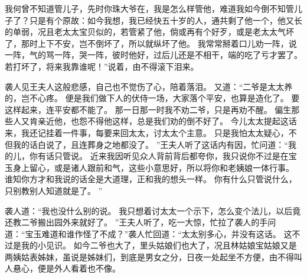 我何曾不知道管儿子，先时你珠大爷在，我是怎么样管他，难道我如今倒不知管儿子了？只是有个原故：如今我想，我已经快五十岁的人，通共剩了他一个，他又长的单弱，况且老太太宝贝似的，若管紧了他，倘或再有个好歹，或是老太太气坏了，那时上下不安，岂不倒坏了，所以就纵坏了他。
我常常掰着口儿劝一阵，说一阵，气的骂一阵，哭一阵，彼时他好，过后儿还是不相干，端的吃了亏才罢了。
若打坏了，将来我靠谁呢！”说着，由不得滚下泪来。
\par
袭人见王夫人这般悲感，自己也不觉伤了心，陪着落泪。
又道：“二爷是太太养的，岂不心疼。
便是我们做下人的伏侍一场，大家落个平安，也算是造化了。
要这样起来，连平安都不能了。
那一日那一时我不劝二爷，只是再劝不醒。
偏生那些人又肯亲近他，也怨不得他这样，总是我们劝的倒不好了。
今儿太太提起这话来，我还记挂着一件事，每要来回太太，讨太太个主意。
只是我怕太太疑心，不但我的话白说了，且连葬身之地都没了。
”王夫人听了这话内有因，忙问道：“我的儿，你有话只管说。
近来我因听见众人背前背后都夸你，我只说你不过是在宝玉身上留心，或是诸人跟前和气，这些小意思好，所以将你和老姨娘一体行事。
谁知你方才和我说的话全是大道理，正和我的想头一样。
你有什么只管说什么，只别教别人知道就是了。
”\par
袭人道：“我也没什么别的说。
我只想着讨太太一个示下，怎么变个法儿，以后竟还教二爷搬出园外来就好了。
”王夫人听了，吃一大惊，忙拉了袭人的手问道：“宝玉难道和谁作怪了不成？”袭人忙回道：“太太别多心，并没有这话。
这不过是我的小见识。
如今二爷也大了，里头姑娘们也大了，况且林姑娘宝姑娘又是两姨姑表姊妹，虽说是姊妹们，到底是男女之分，日夜一处起坐不方便，由不得叫人悬心，便是外人看着也不像。
